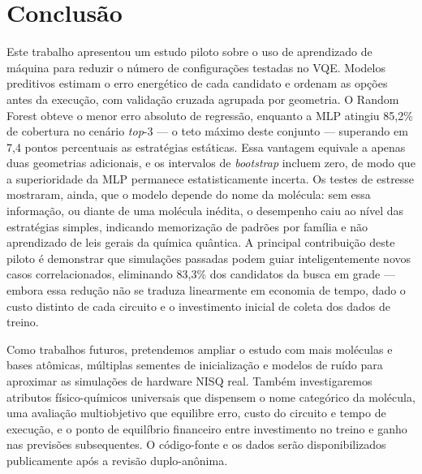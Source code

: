 \section{Conclusão}

Este trabalho apresentou um estudo piloto sobre o uso de aprendizado de máquina
para reduzir o número de configurações testadas no VQE. Modelos preditivos estimam
o erro energético de cada candidato e ordenam as opções antes da execução, com
validação cruzada agrupada por geometria. O Random Forest obteve o menor erro
absoluto de regressão, enquanto a MLP atingiu 85,2\% de cobertura no cenário
\textit{top}-3 — o teto máximo deste conjunto — superando em 7,4 pontos percentuais
as estratégias estáticas. Essa vantagem equivale a apenas duas geometrias adicionais,
e os intervalos de \textit{bootstrap} incluem zero, de modo que a superioridade da
MLP permanece estatisticamente incerta. Os testes de estresse mostraram, ainda, que o
modelo depende do nome da molécula: sem essa informação, ou diante de uma molécula
inédita, o desempenho caiu ao nível das estratégias simples, indicando memorização de
padrões por família e não aprendizado de leis gerais da química quântica. A principal
contribuição deste piloto é demonstrar que simulações passadas podem guiar
inteligentemente novos casos correlacionados, eliminando 83,3\% dos candidatos da
busca em grade — embora essa redução não se traduza linearmente em economia de tempo,
dado o custo distinto de cada circuito e o investimento inicial de coleta dos dados de
treino.

Como trabalhos futuros, pretendemos ampliar o estudo com mais moléculas e bases
atômicas, múltiplas sementes de inicialização e modelos de ruído para aproximar as
simulações de hardware NISQ real. Também investigaremos atributos físico-químicos
universais que dispensem o nome categórico da molécula, uma avaliação multiobjetivo
que equilibre erro, custo do circuito e tempo de execução, e o ponto de equilíbrio
financeiro entre investimento no treino e ganho nas previsões subsequentes. O
código-fonte e os dados serão disponibilizados publicamente após a revisão
duplo-anônima.